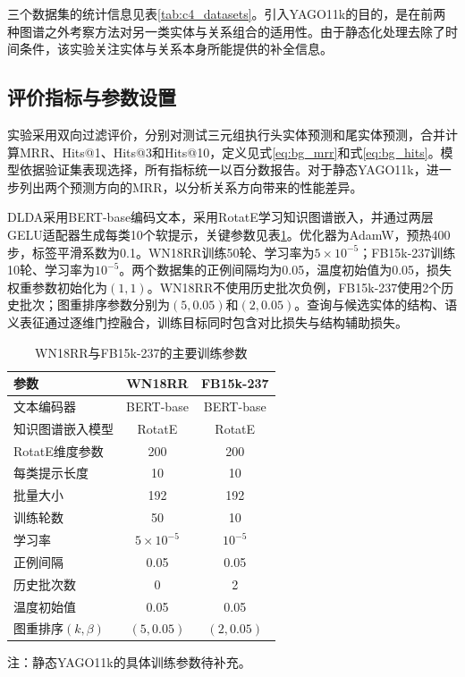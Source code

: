 三个数据集的统计信息见表\ref{tab:c4_datasets}。引入YAGO11k的目的，是在前两种图谱之外考察方法对另一类实体与关系组合的适用性。由于静态化处理去除了时间条件，该实验关注实体与关系本身所能提供的补全信息。

\subsection{评价指标与参数设置}

实验采用双向过滤评价，分别对测试三元组执行头实体预测和尾实体预测，合并计算MRR、Hits@1、Hits@3和Hits@10，定义见式\eqref{eq:bg_mrr}和式\eqref{eq:bg_hits}。模型依据验证集表现选择，所有指标统一以百分数报告。对于静态YAGO11k，进一步列出两个预测方向的MRR，以分析关系方向带来的性能差异。

DLDA采用BERT-base编码文本，采用RotatE学习知识图谱嵌入，并通过两层GELU适配器生成每类10个软提示，关键参数见表\ref{tab:c4_parameters}。优化器为AdamW，预热400步，标签平滑系数为0.1。WN18RR训练50轮、学习率为$5\times10^{-5}$；FB15k-237训练10轮、学习率为$10^{-5}$。两个数据集的正例间隔均为0.05，温度初始值为0.05，损失权重参数初始化为$(1,1)$。WN18RR不使用历史批次负例，FB15k-237使用2个历史批次；图重排序参数分别为$(5,0.05)$和$(2,0.05)$。查询与候选实体的结构、语义表征通过逐维门控融合，训练目标同时包含对比损失与结构辅助损失。

\begin{table}[!htbp]
\centering
{}
\caption{WN18RR与FB15k-237的主要训练参数}
\label{tab:c4_parameters}
\small
\begin{tabular}{lcc}
\toprule
参数 & WN18RR & FB15k-237\\
\midrule
文本编码器 & BERT-base & BERT-base\\
知识图谱嵌入模型 & RotatE & RotatE\\
RotatE维度参数 & 200 & 200\\
每类提示长度 & 10 & 10\\
批量大小 & 192 & 192\\
训练轮数 & 50 & 10\\
学习率 & $5\times10^{-5}$ & $10^{-5}$\\
正例间隔 & 0.05 & 0.05\\
历史批次数 & 0 & 2\\
温度初始值 & 0.05 & 0.05\\
图重排序$(k,\beta)$ & $(5,0.05)$ & $(2,0.05)$\\
\bottomrule
\end{tabular}
\par\smallskip
\begin{minipage}{0.94\textwidth}\small
注：静态YAGO11k的具体训练参数待补充。
\end{minipage}
\end{table}

